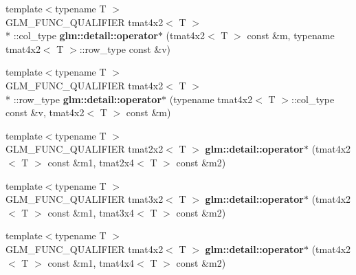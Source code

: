 \begin{DoxyCompactItemize}
\item 
\hypertarget{namespaceglm_1_1detail_a29df121e911684240418a98e1c30a6d6}{{\footnotesize template$<$typename T $>$ }\\G\-L\-M\-\_\-\-F\-U\-N\-C\-\_\-\-Q\-U\-A\-L\-I\-F\-I\-E\-R tmat4x2$<$ T $>$\\*
\-::col\-\_\-type {\bfseries glm\-::detail\-::operator$\ast$} (tmat4x2$<$ T $>$ const \&m, typename tmat4x2$<$ T $>$\-::row\-\_\-type const \&v)}\label{namespaceglm_1_1detail_a29df121e911684240418a98e1c30a6d6}

\item 
\hypertarget{namespaceglm_1_1detail_af89ed1ea58615ec1954e041e1d8d498f}{{\footnotesize template$<$typename T $>$ }\\G\-L\-M\-\_\-\-F\-U\-N\-C\-\_\-\-Q\-U\-A\-L\-I\-F\-I\-E\-R tmat4x2$<$ T $>$\\*
\-::row\-\_\-type {\bfseries glm\-::detail\-::operator$\ast$} (typename tmat4x2$<$ T $>$\-::col\-\_\-type const \&v, tmat4x2$<$ T $>$ const \&m)}\label{namespaceglm_1_1detail_af89ed1ea58615ec1954e041e1d8d498f}

\item 
\hypertarget{namespaceglm_1_1detail_aba7326ac44c2bb0c27924148035726ab}{{\footnotesize template$<$typename T $>$ }\\G\-L\-M\-\_\-\-F\-U\-N\-C\-\_\-\-Q\-U\-A\-L\-I\-F\-I\-E\-R tmat2x2$<$ T $>$ {\bfseries glm\-::detail\-::operator$\ast$} (tmat4x2$<$ T $>$ const \&m1, tmat2x4$<$ T $>$ const \&m2)}\label{namespaceglm_1_1detail_aba7326ac44c2bb0c27924148035726ab}

\item 
\hypertarget{namespaceglm_1_1detail_a4950549c5977807343274daea35e5dba}{{\footnotesize template$<$typename T $>$ }\\G\-L\-M\-\_\-\-F\-U\-N\-C\-\_\-\-Q\-U\-A\-L\-I\-F\-I\-E\-R tmat3x2$<$ T $>$ {\bfseries glm\-::detail\-::operator$\ast$} (tmat4x2$<$ T $>$ const \&m1, tmat3x4$<$ T $>$ const \&m2)}\label{namespaceglm_1_1detail_a4950549c5977807343274daea35e5dba}

\item 
\hypertarget{namespaceglm_1_1detail_a8717f8814d9b23544a066e0d6588bd2c}{{\footnotesize template$<$typename T $>$ }\\G\-L\-M\-\_\-\-F\-U\-N\-C\-\_\-\-Q\-U\-A\-L\-I\-F\-I\-E\-R tmat4x2$<$ T $>$ {\bfseries glm\-::detail\-::operator$\ast$} (tmat4x2$<$ T $>$ const \&m1, tmat4x4$<$ T $>$ const \&m2)}\label{namespaceglm_1_1detail_a8717f8814d9b23544a066e0d6588bd2c}


\end{DoxyCompactItemize}
